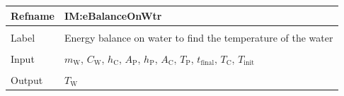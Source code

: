 \documentclass[12pt]{article}
\begin{document}
\vspace{\baselineskip}
\noindent
\begin{minipage}{\textwidth}
\begin{tabular}{>{\raggedright}p{}>{\raggedright\arraybackslash}p{}}
\toprule \textbf{Refname} & \textbf{IM:eBalanceOnWtr}
\label{IM:eBalanceOnWtr}
\\ \midrule \\
Label & Energy balance on water to find the temperature of the water
        
\\ \midrule \\
Input & ${m_{\text{W}}}$, ${C_{\text{W}}}$, ${h_{\text{C}}}$, ${A_{\text{P}}}$, ${h_{\text{P}}}$, ${A_{\text{C}}}$, ${T_{\text{P}}}$, ${t_{\text{final}}}$, ${T_{\text{C}}}$, ${T_{\text{init}}}$
        
\\ \midrule \\
Output & ${T_{\text{W}}}$
         

\end{tabular}
\end{minipage}
\end{document}
